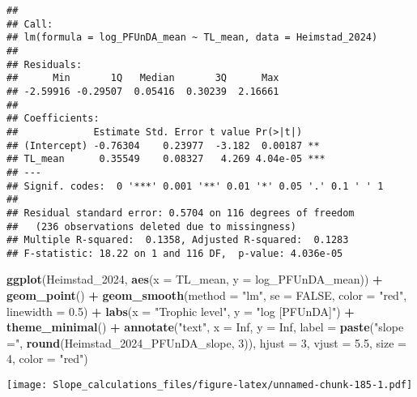 \documentclass[
]{article}
\newenvironment{Shaded}{\begin{snugshade}}{\end{snugshade}}
\newcommand{\AttributeTok}[1]{\textcolor[rgb]{0.13,0.29,0.53}{#1}}
\newcommand{\ConstantTok}[1]{\textcolor[rgb]{0.56,0.35,0.01}{#1}}
\newcommand{\DecValTok}[1]{\textcolor[rgb]{0.00,0.00,0.81}{#1}}
\newcommand{\FloatTok}[1]{\textcolor[rgb]{0.00,0.00,0.81}{#1}}
\newcommand{\FunctionTok}[1]{\textcolor[rgb]{0.13,0.29,0.53}{\textbf{#1}}}
\newcommand{\NormalTok}[1]{#1}
\newcommand{\SpecialCharTok}[1]{\textcolor[rgb]{0.81,0.36,0.00}{\textbf{#1}}}
\newcommand{\StringTok}[1]{\textcolor[rgb]{0.31,0.60,0.02}{#1}}
\begin{document}
\begin{verbatim}
## 
## Call:
## lm(formula = log_PFUnDA_mean ~ TL_mean, data = Heimstad_2024)
## 
## Residuals:
##      Min       1Q   Median       3Q      Max 
## -2.59916 -0.29507  0.05416  0.30239  2.16661 
## 
## Coefficients:
##             Estimate Std. Error t value Pr(>|t|)    
## (Intercept) -0.76304    0.23977  -3.182  0.00187 ** 
## TL_mean      0.35549    0.08327   4.269 4.04e-05 ***
## ---
## Signif. codes:  0 '***' 0.001 '**' 0.01 '*' 0.05 '.' 0.1 ' ' 1
## 
## Residual standard error: 0.5704 on 116 degrees of freedom
##   (236 observations deleted due to missingness)
## Multiple R-squared:  0.1358, Adjusted R-squared:  0.1283 
## F-statistic: 18.22 on 1 and 116 DF,  p-value: 4.036e-05
\end{verbatim}

\begin{Shaded}
\begin{Highlighting}[]
\FunctionTok{ggplot}\NormalTok{(Heimstad\_2024, }\FunctionTok{aes}\NormalTok{(}\AttributeTok{x =}\NormalTok{ TL\_mean, }\AttributeTok{y =}\NormalTok{ log\_PFUnDA\_mean)) }\SpecialCharTok{+}
  \FunctionTok{geom\_point}\NormalTok{() }\SpecialCharTok{+}
  \FunctionTok{geom\_smooth}\NormalTok{(}\AttributeTok{method =} \StringTok{"lm"}\NormalTok{, }\AttributeTok{se =} \ConstantTok{FALSE}\NormalTok{, }\AttributeTok{color =} \StringTok{"red"}\NormalTok{, }\AttributeTok{linewidth =} \FloatTok{0.5}\NormalTok{) }\SpecialCharTok{+}
  \FunctionTok{labs}\NormalTok{(}\AttributeTok{x =} \StringTok{"Trophic level"}\NormalTok{,}
       \AttributeTok{y =} \StringTok{"log [PFUnDA]"}\NormalTok{) }\SpecialCharTok{+}
  \FunctionTok{theme\_minimal}\NormalTok{() }\SpecialCharTok{+}
  \FunctionTok{annotate}\NormalTok{(}\StringTok{"text"}\NormalTok{, }\AttributeTok{x =} \ConstantTok{Inf}\NormalTok{, }\AttributeTok{y =} \ConstantTok{Inf}\NormalTok{, }\AttributeTok{label =} \FunctionTok{paste}\NormalTok{(}\StringTok{"slope ="}\NormalTok{, }\FunctionTok{round}\NormalTok{(Heimstad\_2024\_PFUnDA\_slope, }\DecValTok{3}\NormalTok{)), }
           \AttributeTok{hjust =} \DecValTok{3}\NormalTok{, }\AttributeTok{vjust =} \FloatTok{5.5}\NormalTok{, }\AttributeTok{size =} \DecValTok{4}\NormalTok{, }\AttributeTok{color =} \StringTok{"red"}\NormalTok{)}
\end{Highlighting}
\end{Shaded}

\texttt{[image: Slope\_calculations\_files/figure-latex/unnamed-chunk-185-1.pdf]}
\end{document}
